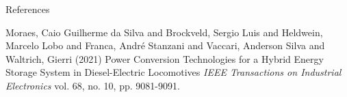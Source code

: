 \documentclass[aspectratio=169]{beamer}
\begin{document}
\begin{frame}[allowframebreaks]{References}

\begin{thebibliography}{9}
	
Moraes, Caio Guilherme da Silva and Brockveld, Sergio Luis and Heldwein, Marcelo Lobo and Franca, André Stanzani and Vaccari, Anderson Silva and Waltrich, Gierri (2021)
\newblock Power Conversion Technologies for a Hybrid Energy Storage System in Diesel-Electric Locomotives
\newblock \emph{IEEE Transactions on Industrial Electronics}  vol. 68, no. 10, pp. 9081-9091.


\end{thebibliography}
\end{frame}

\begin{frame}
	\begin{columns}
		\column{2.5cm}
		\column{5cm}
		\Huge{~}
		\column{2.5cm}
	\end{columns}
\end{frame}
\end{document}
